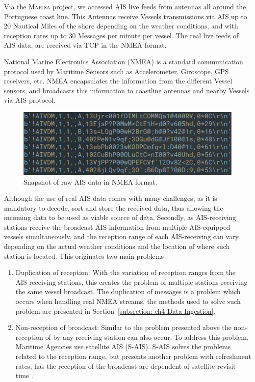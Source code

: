 Via the \textsc{Marisa} project, we accessed AIS live feeds from antennas all around the Portuguese coast line. This Antennas receive Vessels transmissions via AIS up to 20 Nautical Miles of the shore depending on the weather conditions, and with reception rates up to 30 Messages per minute per vessel. The real live feeds of AIS data, are received via TCP in the NMEA format.

National Marine Electronics Association (NMEA) is a standard communication protocol used by Maritime Sensors such as Accelerometer, Giroscope, GPS receivers, etc.
NMEA encapsulates the information from the different Vessel sensors, and broadcasts this information to coastline antennas and nearby Vessels via AIS protocol.

\begin{figure}[H]
\centering
\includegraphics[scale = .55]{figures/Ch3/NMEAexample.png}
\caption{Snapshot of raw AIS data in NMEA format.}
\label{fig:NMEAexample}
\end{figure}
Although the use of real AIS data comes with many challenges, as it is mandatory to decode, sort and store the received data, thus allowing the incoming data to be used as viable source of data. Secondly, as AIS-receiving stations receive the broadcast AIS information from multiple AIS-equipped vessels simultaneously, and the reception range of each AIS-receiving can vary depending on the actual weather conditions and the location of where such station is located. This originates two main problems :
\begin{enumerate}
\item Duplication of reception:  With the variation of reception ranges from the AIS-receiving stations, this creates the problem of multiple stations receiving the same vessel broadcast. The duplication of messages is a problem which occurs when handling real NMEA streams, the methods used to solve such problem are presented in Section~\ref{subsection: ch4 Data Ingestion}.

\item Non-reception of broadcast: Similar to the problem presented above the non-reception of by any receiving station can also occur. To address this problem, Maritime Agencies use satellite AIS (S-AIS). S-AIS solves the problems related to the reception range, but presents another problem with refreshment rates, has the reception of the broadcast are dependent of satellite revisit time \cite{Robards2016ConservationReview}. 
\end{enumerate}


